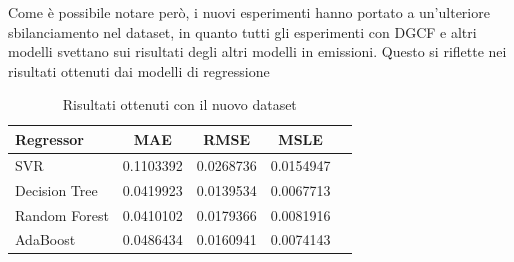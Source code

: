 \noindent Come è possibile notare però, i nuovi esperimenti hanno portato a un'ulteriore sbilanciamento nel dataset, in quanto tutti gli esperimenti con DGCF e altri modelli svettano sui risultati degli altri modelli in emissioni.
Questo si riflette nei risultati ottenuti dai modelli di regressione

\begin{table}[H]
    \centering
    \begin{tabular}{|>{\centering\arraybackslash}m{5cm}|c|c|c|c|}
        \hline
        \textbf{Regressor} & \textbf{MAE} & \textbf{RMSE} & \textbf{MSLE} \\ [10pt]
        \hline
        SVR & 0.1103392 & 0.0268736 & 0.0154947 \\ [10pt]
        \hline
        Decision Tree & 0.0419923 & 0.0139534 & 0.0067713 \\ [10pt]
        \hline
        Random Forest & 0.0410102 & 0.0179366 & 0.0081916 \\ [10pt]
        \hline
        AdaBoost & 0.0486434 & 0.0160941 & 0.0074143 \\ [10pt]
        \hline
    \end{tabular}
    \caption{Risultati ottenuti con il nuovo dataset}
    \label{tab:results} 
\end{table}

